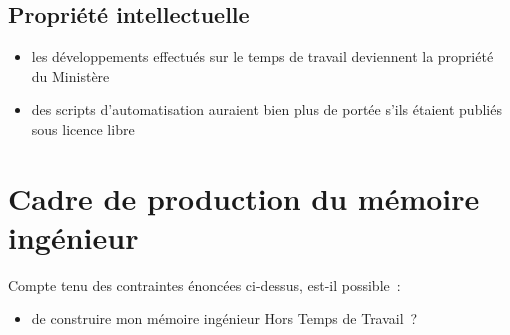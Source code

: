 \documentclass[10pt]{article}
\newenvironment{itmz}{\begin{itemize}
\setlength{\itemsep}{0em}
}{\end{itemize}}
\begin{document}
\subsection{Propriété intellectuelle}

\begin{itmz}
\item{les développements effectués sur le temps de travail deviennent la propriété du Ministère}
\item{des scripts d’automatisation auraient bien plus de portée s’ils étaient publiés sous licence libre}
\end{itmz}

\section{Cadre de production du mémoire ingénieur}

Compte tenu des contraintes énoncées ci-dessus, est-il possible :
\begin{itmz}
\item{de construire mon mémoire ingénieur Hors Temps de Travail ?}
\end{itmz}
\end{document}
